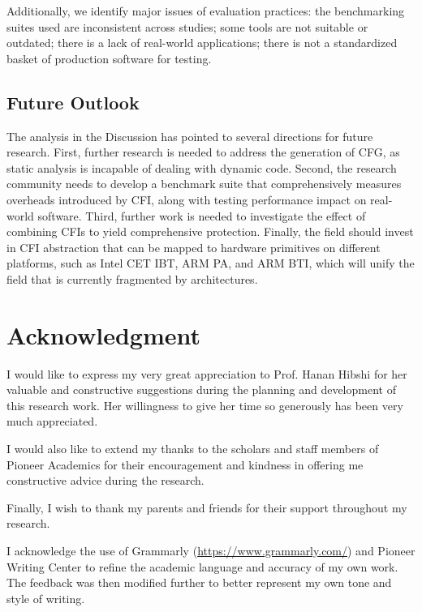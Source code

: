 \documentclass[journal,onecolumn]{IEEEtran}
\begin{document}
Additionally, we identify major issues of evaluation practices: the benchmarking suites used are inconsistent across studies; some tools are not suitable or outdated; there is a lack of real-world applications; there is not a standardized basket of production software for testing.

\subsection{Future Outlook}

The analysis in the Discussion has pointed to several directions for future research. First, further research is needed to address the generation of CFG, as static analysis is incapable of dealing with dynamic code. Second, the research community needs to develop a benchmark suite that comprehensively measures overheads introduced by CFI, along with testing performance impact on real-world software. Third, further work is needed to investigate the effect of combining CFIs to yield comprehensive protection. Finally, the field should invest in CFI abstraction that can be mapped to hardware primitives on different platforms, such as Intel CET IBT, ARM PA, and ARM BTI, which will unify the field that is currently fragmented by architectures.

\section*{Acknowledgment}

I would like to express my very great appreciation to Prof. Hanan Hibshi for her valuable and constructive suggestions during the planning and development of this research work. Her willingness to give her time so generously has been very much appreciated.

I would also like to extend my thanks to the scholars and staff members of Pioneer Academics for their encouragement and kindness in offering me constructive advice during the research.

Finally, I wish to thank my parents and friends for their support throughout my research.

I acknowledge the use of Grammarly (\url{https://www.grammarly.com/}) and Pioneer Writing Center to refine the academic language and accuracy of my own work. The feedback was then modified further to better represent my own tone and style of writing.



\end{document}
